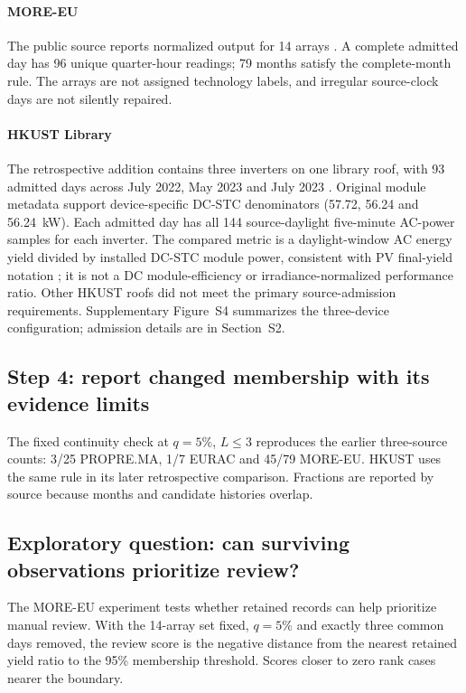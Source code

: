 \documentclass[preprint,12pt]{elsarticle}
\begin{document}
\paragraph{MORE-EU} The public source reports normalized output for 14 arrays \cite{moreeu2026}. A complete admitted day has 96 unique quarter-hour readings; 79 months satisfy the complete-month rule. The arrays are not assigned technology labels, and irregular source-clock days are not silently repaired.

\paragraph{HKUST Library} The retrospective addition contains three inverters on one library roof, with 93 admitted days across July 2022, May 2023 and July 2023 \cite{lin2025,hkust2024}. Original module metadata support device-specific DC-STC denominators (57.72, 56.24 and 56.24~kW). Each admitted day has all 144 source-daylight five-minute AC-power samples for each inverter. The compared metric is a daylight-window AC energy yield divided by installed DC-STC module power, consistent with PV final-yield notation \cite{iec61724_2021}; it is not a DC module-efficiency or irradiance-normalized performance ratio. Other HKUST roofs did not meet the primary source-admission requirements. Supplementary Figure~S4 summarizes the three-device configuration; admission details are in Section~S2.


\subsection{Step 4: report changed membership with its evidence limits}
The fixed continuity check at $q=5\%$, $L\leq3$ reproduces the earlier three-source counts: 3/25 PROPRE.MA, 1/7 EURAC and 45/79 MORE-EU. HKUST uses the same rule in its later retrospective comparison. Fractions are reported by source because months and candidate histories overlap.

\subsection{Exploratory question: can surviving observations prioritize review?}
The MORE-EU experiment tests whether retained records can help prioritize manual review. With the 14-array set fixed, $q=5\%$ and exactly three common days removed, the review score is the negative distance from the nearest retained yield ratio to the 95\% membership threshold. Scores closer to zero rank cases nearer the boundary.
\end{document}
